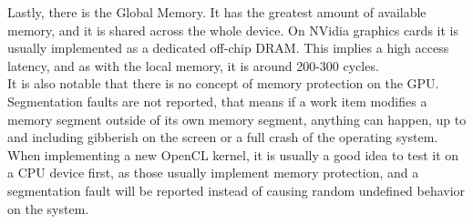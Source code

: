 Lastly, there is the Global Memory. It has the greatest amount of available memory, and it is shared across the whole device. On NVidia graphics cards it is usually implemented as a dedicated off-chip DRAM. This implies a high access latency, and as with the local memory, it is around 200-300 cycles.
\cite{hwu2009compute,tompson2012introduction} \\

It is also notable that there is no concept of memory protection on the GPU. Segmentation faults are not reported, that means if a work item modifies a memory segment outside of its own memory segment, anything can happen, up to and including gibberish on the screen or a full crash of the operating system. When implementing a new OpenCL kernel, it is usually a good idea to test it on a CPU device first, as those usually implement memory protection, and a segmentation fault will be reported instead of causing random undefined behavior on the system. \cite{tompson2012introduction}

